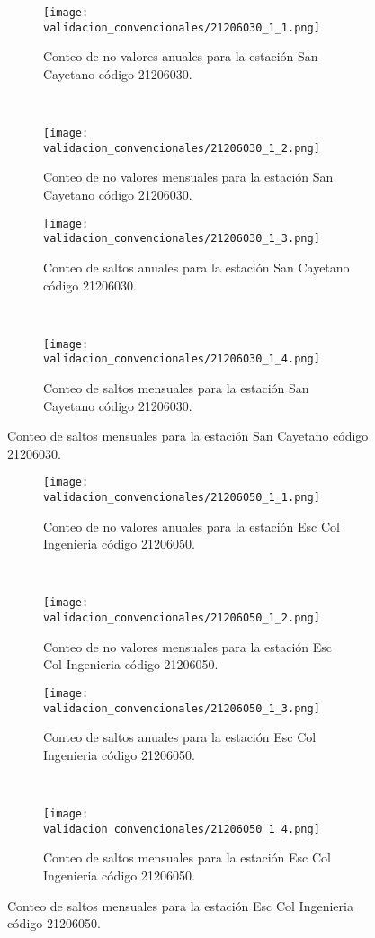 \begin{figure}[H]\ContinuedFloat
\centering
	\begin{subfigure}[normla]{0.4\textwidth}
	\texttt{[image: validacion\_convencionales/21206030\_1\_1.png]}
		\caption{Conteo de no valores anuales para la estación San Cayetano código 21206030.}
		\label{subfig:a1}
		\end{subfigure}
		~
    \begin{subfigure}[normla]{0.4\textwidth}
	\texttt{[image: validacion\_convencionales/21206030\_1\_2.png]}
		\caption{Conteo de no valores mensuales para la estación San Cayetano código 21206030.}
		\label{subfig:a2}
		\end{subfigure}
		
    \begin{subfigure}[normla]{0.4\textwidth}
	\texttt{[image: validacion\_convencionales/21206030\_1\_3.png]}
		\caption{Conteo de saltos anuales para la estación San Cayetano código 21206030.}
		\label{subfig:a1}
		\end{subfigure}
		~
    \begin{subfigure}[normla]{0.4\textwidth}
	\texttt{[image: validacion\_convencionales/21206030\_1\_4.png]}
		\caption{Conteo de saltos mensuales para la estación San Cayetano código 21206030.}
		\label{subfig:a2}
		\end{subfigure}

	
\end{figure}
           
\begin{figure}[H]\ContinuedFloat
\centering
	\begin{subfigure}[normla]{0.4\textwidth}
	\texttt{[image: validacion\_convencionales/21206050\_1\_1.png]}
		\caption{Conteo de no valores anuales para la estación Esc Col Ingenieria código 21206050.}
		\label{subfig:a1}
		\end{subfigure}
		~
    \begin{subfigure}[normla]{0.4\textwidth}
	\texttt{[image: validacion\_convencionales/21206050\_1\_2.png]}
		\caption{Conteo de no valores mensuales para la estación Esc Col Ingenieria código 21206050.}
		\label{subfig:a2}
		\end{subfigure}
		
    \begin{subfigure}[normla]{0.4\textwidth}
	\texttt{[image: validacion\_convencionales/21206050\_1\_3.png]}
		\caption{Conteo de saltos anuales para la estación Esc Col Ingenieria código 21206050.}
		\label{subfig:a1}
		\end{subfigure}
		~
    \begin{subfigure}[normla]{0.4\textwidth}
	\texttt{[image: validacion\_convencionales/21206050\_1\_4.png]}
		\caption{Conteo de saltos mensuales para la estación Esc Col Ingenieria código 21206050.}
		\label{subfig:a2}
		\end{subfigure}

	
\end{figure}
           
